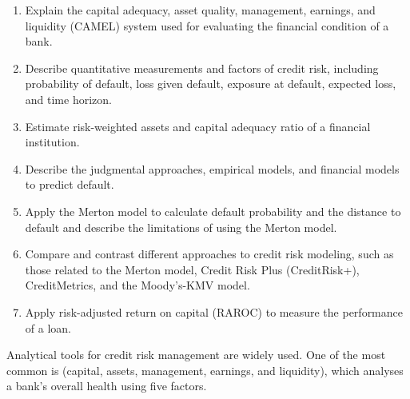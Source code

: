 
\begin{crkeybox}
\begin{enumerate}[label=\textbf{\alph*.},leftmargin=2em]
\item Explain the capital adequacy, asset quality, management, earnings, and liquidity (CAMEL) system used for evaluating the financial condition of a bank.
\item Describe quantitative measurements and factors of credit risk, including probability of default, loss given default, exposure at default, expected loss, and time horizon.
\item Estimate risk-weighted assets and capital adequacy ratio of a financial institution.
\item Describe the judgmental approaches, empirical models, and financial models to predict default.
\item Apply the Merton model to calculate default probability and the distance to default and describe the limitations of using the Merton model.
\item Compare and contrast different approaches to credit risk modeling, such as those related to the Merton model, Credit Risk Plus (CreditRisk+), CreditMetrics, and the Moody's-KMV model.
\item Apply risk-adjusted return on capital (RAROC) to measure the performance of a loan.
\end{enumerate}
\end{crkeybox}


Analytical tools for credit risk management are widely used. One of the most
common is  (capital, assets, management, earnings, and liquidity),
which analyses a bank's overall health using five factors.

